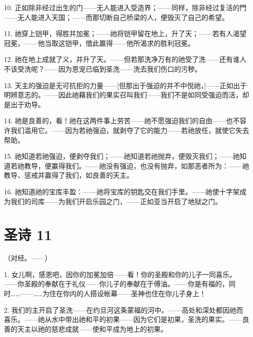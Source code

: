 10. 正如除非经过出生的门——无人能进入受造界；——同样，除非经过复活的門——无人能进入天国；——而那切断自己桥梁的人，便毁灭了自己的希望。\par

11. 祂穿上铠甲，得胜并加冕；——祂将铠甲留在地上，升了天；——若有人渴望冠冕，——他当取这铠甲，借此赢得——他所渴求的胜利冠冕。\par

12. 祂在地上成就了义，并升了天。——但若那洗净万有的祂受了洗——还有谁人不该受洗呢？——因为恩宠已临到圣洗——洗去我们伤口的污秽。\par

13. 天主的强迫是无可抗拒的力量——[但那出于强迫的并不中悦祂，]——正如出于明辨意志的。——因此祂藉我们的果实召叫我们——我们不是如同受强迫而活，却是出于劝导。\par

14. 祂是良善的，看！祂在这两件事上劳苦——祂不愿强迫我们的自由——也不容许我们滥用它。——因为若祂强迫，就剥夺了它的能力——若祂放任，就使它失去帮助。\par

15. 祂知道若祂强迫，便剥夺我们；——祂知道若祂抛弃，便毁灭我们；——祂知道若祂教导，便赢得我们。——祂没有强迫，也没有抛弃，如那恶者所为：——祂教导、惩戒并赢得了我们，如良善的天主。\par

16. 祂知道祂的宝库丰盈：——祂将宝库的钥匙交在我们手里。——祂使十字架成为我们的司库——为我们开启乐园之门，——正如亚当开启了地狱之门。\par


\section{圣诗 11}

（对经。——）\par

1. 女儿啊，感恩吧，因你的加冕加倍——看！你的圣殿和你的儿子一同喜乐。——你圣殿的奉献在于礼仪——你儿子的奉献在于傅油。——你是有福的，同时……——……为住在你内的人搭设帐幕——圣神也住在你儿子身上！\par

2. 我们的主开启了圣洗——在约旦河这条蒙福的河中。——高处和深处都因祂而喜乐。——祂从水中带出祂和平的初果——因为它们是初果，圣洗的果实。——良善的天主以祂的慈悲成就——使和平成为地上的初果。\par

